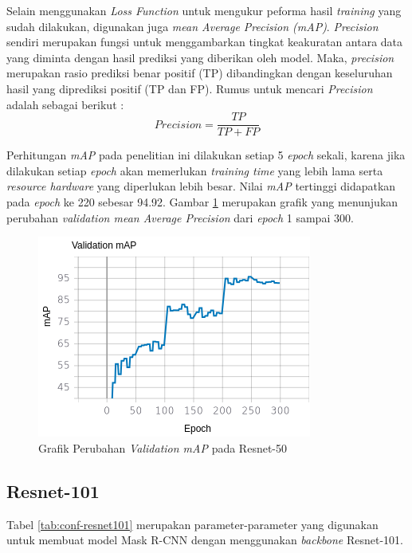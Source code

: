 Selain menggunakan \textit{Loss Function} untuk mengukur peforma hasil \textit{training} yang sudah dilakukan, digunakan juga \textit{mean Average Precision (mAP)}. \textit{Precision} sendiri merupakan fungsi untuk menggambarkan tingkat keakuratan antara data yang diminta dengan hasil prediksi yang diberikan oleh model. Maka, \textit{precision} merupakan rasio prediksi benar positif (TP) dibandingkan dengan keseluruhan hasil yang diprediksi positif (TP dan FP). Rumus untuk mencari \textit{Precision} adalah sebagai berikut :
\begin{equation}
	Precision = \frac{TP}{TP+FP} 
\end{equation}

Perhitungan \textit{mAP} pada penelitian ini dilakukan setiap 5 \textit{epoch} sekali, karena jika dilakukan setiap \textit{epoch} akan memerlukan \textit{training time} yang lebih lama serta \textit{resource hardware} yang diperlukan lebih besar. Nilai \textit{mAP} tertinggi didapatkan pada \textit{epoch} ke 220 sebesar 94.92. Gambar \ref{fig:resnet50-map} merupakan grafik yang menunjukan perubahan \textit{validation mean Average Precision} dari \textit{epoch} 1 sampai 300. 

\begin{figure}[h]
	\centering
	\includegraphics[scale=0.4]{gambar/resnet50-map.png}
	\caption{Grafik Perubahan \textit{Validation mAP} pada Resnet-50}
	\label{fig:resnet50-map}
\end{figure}

\newpage

\subsection{Resnet-101}
\label{subsec:resnet101}

Tabel \ref{tab:conf-resnet101} merupakan parameter-parameter yang digunakan untuk membuat model Mask R-CNN dengan menggunakan \textit{backbone} Resnet-101.

